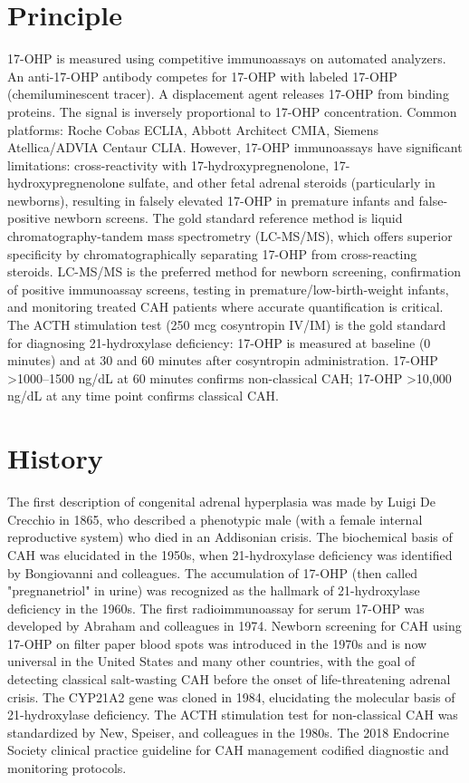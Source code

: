 \section*{Principle}
17-OHP is measured using competitive immunoassays on automated analyzers. An anti-17-OHP antibody competes for 17-OHP with labeled 17-OHP (chemiluminescent tracer). A displacement agent releases 17-OHP from binding proteins. The signal is inversely proportional to 17-OHP concentration. Common platforms: Roche Cobas ECLIA, Abbott Architect CMIA, Siemens Atellica/ADVIA Centaur CLIA. However, 17-OHP immunoassays have significant limitations: cross-reactivity with 17-hydroxypregnenolone, 17-hydroxypregnenolone sulfate, and other fetal adrenal steroids (particularly in newborns), resulting in falsely elevated 17-OHP in premature infants and false-positive newborn screens. The gold standard reference method is liquid chromatography-tandem mass spectrometry (LC-MS/MS), which offers superior specificity by chromatographically separating 17-OHP from cross-reacting steroids. LC-MS/MS is the preferred method for newborn screening, confirmation of positive immunoassay screens, testing in premature/low-birth-weight infants, and monitoring treated CAH patients where accurate quantification is critical. The ACTH stimulation test (250 mcg cosyntropin IV/IM) is the gold standard for diagnosing 21-hydroxylase deficiency: 17-OHP is measured at baseline (0 minutes) and at 30 and 60 minutes after cosyntropin administration. 17-OHP >1000--1500 ng/dL at 60 minutes confirms non-classical CAH; 17-OHP >10,000 ng/dL at any time point confirms classical CAH.

\section*{History}
The first description of congenital adrenal hyperplasia was made by Luigi De Crecchio in 1865, who described a phenotypic male (with a female internal reproductive system) who died in an Addisonian crisis. The biochemical basis of CAH was elucidated in the 1950s, when 21-hydroxylase deficiency was identified by Bongiovanni and colleagues. The accumulation of 17-OHP (then called "pregnanetriol" in urine) was recognized as the hallmark of 21-hydroxylase deficiency in the 1960s. The first radioimmunoassay for serum 17-OHP was developed by Abraham and colleagues in 1974. Newborn screening for CAH using 17-OHP on filter paper blood spots was introduced in the 1970s and is now universal in the United States and many other countries, with the goal of detecting classical salt-wasting CAH before the onset of life-threatening adrenal crisis. The CYP21A2 gene was cloned in 1984, elucidating the molecular basis of 21-hydroxylase deficiency. The ACTH stimulation test for non-classical CAH was standardized by New, Speiser, and colleagues in the 1980s. The 2018 Endocrine Society clinical practice guideline for CAH management codified diagnostic and monitoring protocols.


